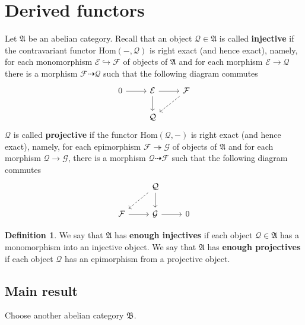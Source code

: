 \documentclass[12pt,b5paper,notitlepage]{report}
\theoremstyle{definition}
\newtheorem{df}{Definition}[section]
\theoremstyle{plain}
\newcommand{\fk}{\mathfrak}
\newcommand{\mc}{\mathcal}
\newcommand{\Hom}{\mathrm{Hom}}
\numberwithin{equation}{section}
\begin{document}
\section{Derived functors}

Let $\fk A$ be an abelian category. Recall that an object $\mc Q\in\fk A$ is called \textbf{injective}  if the contravariant functor $\Hom(-,\mc Q)$ is right exact (and hence exact), namely, for each monomorphism $\mc E\hookrightarrow\mc F$ of objects of $\fk A$ and for each morphism $\mc E\rightarrow\mc Q$ there is a morphism $\mc F\dashrightarrow\mc Q$ such that the following diagram commutes
\begin{equation*}
\begin{tikzcd}
	0 & {\mc E} & {\mc F} \\
	& {\mc Q}
	\arrow[from=1-1, to=1-2]
	\arrow[from=1-2, to=1-3]
	\arrow[from=1-2, to=2-2]
	\arrow[dashed, to=2-2, from=1-3]
\end{tikzcd}
\end{equation*}
$\mc Q$ is called \textbf{projective}  if the functor $\Hom(\mc Q,-)$ is right exact (and hence exact), namely, for each epimorphism $\mc F\twoheadrightarrow\mc G$ of objects of $\fk A$ and for each morphism $\mc Q\rightarrow\mc G$, there is a morphism $\mc Q\dashrightarrow\mc F$ such that the following diagram commutes
\begin{equation*}
\begin{tikzcd}
                & \mc Q \arrow[d] \arrow[ld, dashed] &   \\
\mc F \arrow[r] & \mc G \arrow[r]                    & 0
\end{tikzcd}
\end{equation*}


\begin{df}
We say that $\fk A$ has \textbf{enough injectives}  if each object $\mc Q\in\fk A$ has a monomorphism into an injective object. We say that $\fk A$ has \textbf{enough projectives} if each object $\mc Q$ has an epimorphism from a projective object.
\end{df}


\subsection{Main result}

Choose another abelian category $\fk B$.
\end{document}
